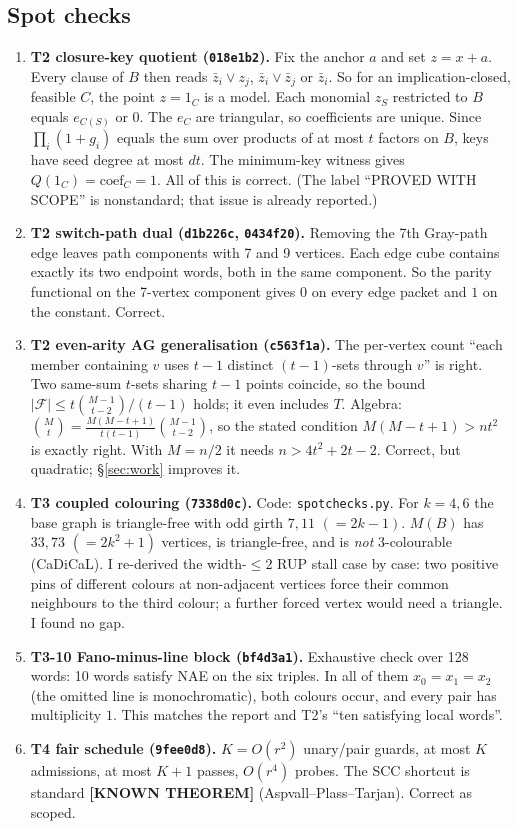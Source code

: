 \documentclass[11pt]{article}
\theoremstyle{definition}
\theoremstyle{remark}
\newcommand{\lab}[1]{\textbf{[#1]}}
\begin{document}
\subsection{Spot checks}\label{sec:spot}
\begin{enumerate}
\item \textbf{T2 closure-key quotient (\texttt{018e1b2}).} Fix the anchor $a$ and set
$z=x+a$. Every clause of $B$ then reads $\bar z_i\vee z_j$, $\bar z_i\vee\bar z_j$ or
$\bar z_i$. So for an implication-closed, feasible $C$, the point $z=1_C$ is a model. Each
monomial $z_S$ restricted to $B$ equals $e_{C(S)}$ or $0$. The $e_C$ are triangular, so
coefficients are unique. Since $\prod_i(1+g_i)$ equals the sum over products of at most $t$
factors on $B$, keys have seed degree at most $dt$. The minimum-key witness gives
$Q(1_C)=\mathrm{coef}_C=1$. All of this is correct. (The label ``PROVED WITH SCOPE'' is
nonstandard; that issue is already reported.)
\item \textbf{T2 switch-path dual (\texttt{d1b226c}, \texttt{0434f20}).} Removing the 7th
Gray-path edge leaves path components with 7 and 9 vertices. Each edge cube contains exactly
its two endpoint words, both in the same component. So the parity functional on the 7-vertex
component gives $0$ on every edge packet and $1$ on the constant. Correct.
\item \textbf{T2 even-arity AG generalisation (\texttt{c563f1a}).} The per-vertex count
``each member containing $v$ uses $t-1$ distinct $(t-1)$-sets through $v$'' is right. Two
same-sum $t$-sets sharing $t-1$ points coincide, so the bound
$|\mathcal F|\le t\binom{M-1}{t-2}/(t-1)$ holds; it even includes $T$. Algebra:
$\binom Mt=\frac{M(M-t+1)}{t(t-1)}\binom{M-1}{t-2}$, so the stated condition
$M(M-t+1)>nt^2$ is exactly right. With $M=n/2$ it needs $n>4t^2+2t-2$. Correct, but
quadratic; \S\ref{sec:work} improves it.
\item \textbf{T3 coupled colouring (\texttt{7338d0c}).} Code: \texttt{spotchecks.py}. For
$k=4,6$ the base graph is triangle-free with odd girth $7,11$ $(=2k-1)$. $M(B)$ has
$33,73$ $(=2k^2+1)$ vertices, is triangle-free, and is \emph{not} 3-colourable (CaDiCaL).
I re-derived the width-$\le2$ RUP stall case by case: two positive pins of different colours
at non-adjacent vertices force their common neighbours to the third colour; a further forced
vertex would need a triangle. I found no gap.
\item \textbf{T3-10 Fano-minus-line block (\texttt{bf4d3a1}).} Exhaustive check over 128
words: 10 words satisfy NAE on the six triples. In all of them $x_0=x_1=x_2$ (the omitted
line is monochromatic), both colours occur, and every pair has multiplicity $1$. This matches
the report and T2's ``ten satisfying local words''.
\item \textbf{T4 fair schedule (\texttt{9fee0d8}).} $K=O(r^2)$ unary/pair guards, at most
$K$ admissions, at most $K+1$ passes, $O(r^4)$ probes. The SCC shortcut is standard
\lab{KNOWN THEOREM} (Aspvall--Plass--Tarjan). Correct as scoped.
\end{enumerate}
\end{document}
